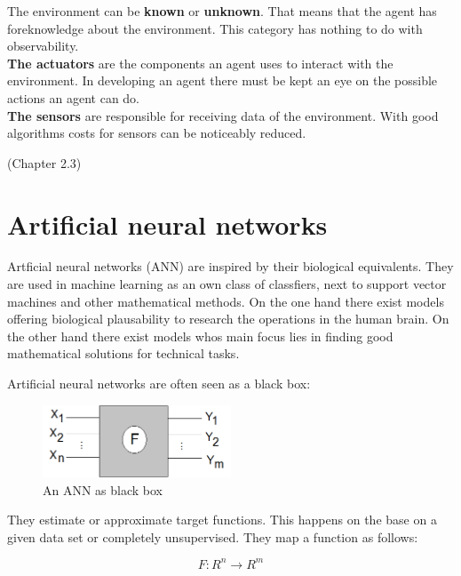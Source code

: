 \documentclass[10pt,a4paper,DIV=11]{scrreprt}
\begin{document}
The environment can be \textbf{known} or \textbf{unknown}. That means that the agent has foreknowledge about the environment. This category has nothing to do with observability. \\


\textbf{The actuators} are the components an agent uses to interact with the environment. In developing an agent there must be kept an eye on the possible actions an agent can do.\\

\textbf{The sensors} are responsible for receiving data of the environment. With good algorithms costs for sensors can be noticeably reduced.


(\cite{ai}Chapter 2.3)

\chapter{Artificial neural networks}
Artficial neural networks (ANN) are inspired by their biological equivalents.
They are used in machine learning as an own class of classfiers, next to support vector machines
and other mathematical methods. On the one hand there exist models offering biological plausability to research the
operations in the human brain. On the other hand there exist models whos main focus lies in finding good mathematical solutions for technical tasks.

Artificial neural networks are often seen as a black box: \\

\begin{center}
	\begin{figure}[H]
		\centering
		\includegraphics[width=0.5\textwidth,scale=1.0]{files/nn-bb.png}  
		\caption{An ANN as black box \cite{rojas}}
		\label{fig:neuron}
	\end{figure}
\end{center} 
They estimate or approximate target functions. 
This happens on the base on a given data set or completely unsupervised.
They map a function as follows:\cite{rojas}

\begin{equation}
	F: R^n \to R^m 
\end{equation} 
\end{document}
